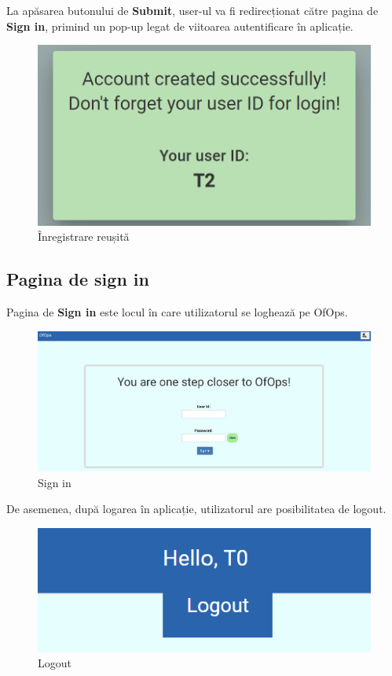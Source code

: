 La apăsarea butonului de \textbf{Submit}, user-ul va fi redirecționat către pagina de \textbf{Sign in}, primind un pop-up legat de viitoarea autentificare în aplicație.  

\begin{figure}[!htb]
    \centering
    \includegraphics[width=0.9\linewidth]{images/autentf.png}
    \caption{Înregistrare reușită}
    \label{fig:autentf}
\end{figure}

\subsection{Pagina de sign in}
Pagina de \textbf{Sign in} este locul în care utilizatorul se loghează pe OfOps. 

\begin{figure}[!htb]
    \centering
    \includegraphics[width=0.9\linewidth]{images/signin.png}
    \caption{Sign in}
    \label{fig:signin}
\end{figure}

\newpage

De asemenea, după logarea în aplicație, utilizatorul are posibilitatea de logout.

\begin{figure}[!htb]
    \centering
    \includegraphics[width=0.9\linewidth]{images/logout.png}
    \caption{Logout}
    \label{fig:logout}
\end{figure}

